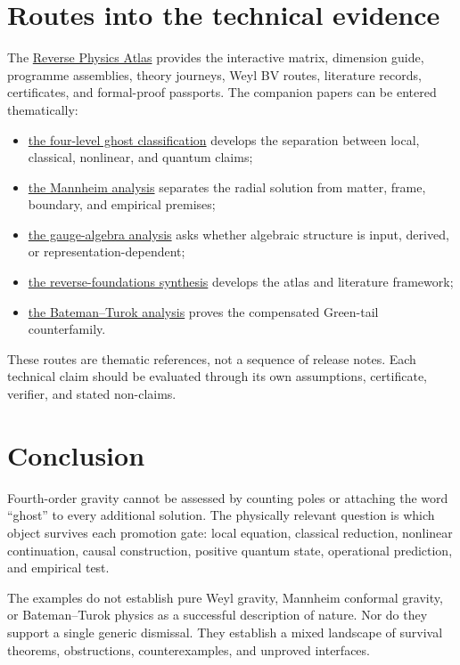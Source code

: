 \documentclass[11pt]{article}
\begin{document}
\section{Routes into the technical evidence}

The \href{../foundations/site/index.html}{Reverse Physics Atlas} provides the
interactive matrix, dimension guide, programme assemblies, theory journeys,
Weyl BV routes, literature records, certificates, and formal-proof passports.
The companion papers can be entered thematically:
\begin{itemize}
\item \href{15-four-level-ghost-classification-phase1-synthesis.pdf}{the
four-level ghost classification} develops the separation between local,
classical, nonlinear, and quantum claims;
\item \href{19-what-conformal-gravity-must-assume.pdf}{the Mannheim analysis}
separates the radial solution from matter, frame, boundary, and empirical
premises;
\item \href{20-is-the-gauge-algebra-an-assumption.pdf}{the gauge-algebra
analysis} asks whether algebraic structure is input, derived, or
representation-dependent;
\item \href{21-reverse-foundations-of-physics.pdf}{the reverse-foundations
synthesis} develops the atlas and literature framework;
\item \href{22-bateman-turok-euclidean-torus-collapse.pdf}{the
Bateman--Turok analysis} proves the compensated Green-tail counterfamily.
\end{itemize}

These routes are thematic references, not a sequence of release notes.  Each
technical claim should be evaluated through its own assumptions, certificate,
verifier, and stated non-claims.

\section{Conclusion}

Fourth-order gravity cannot be assessed by counting poles or attaching the
word ``ghost'' to every additional solution.  The physically relevant
question is which object survives each promotion gate: local equation,
classical reduction, nonlinear continuation, causal construction, positive
quantum state, operational prediction, and empirical test.

The examples do not establish pure Weyl gravity, Mannheim conformal gravity,
or Bateman--Turok physics as a successful description of nature.  Nor do they
support a single generic dismissal.  They establish a mixed landscape of
survival theorems, obstructions, counterexamples, and unproved interfaces.
\end{document}
